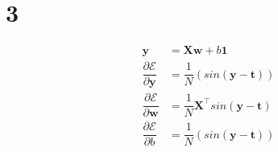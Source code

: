 \documentclass{article}
\begin{document}
\newpage
\section*{3}

\begin{align*}
\textbf{y} &= \mathbf{Xw} + b\mathbf{1} \\
\dfrac{\partial \mathbf{\mathcal{E}}}{\partial \textbf{y}} &= \dfrac{1}{N} (sin(\mathbf{y} - \mathbf{t})) \\
\dfrac{\partial \mathbf{\mathcal{E}}}{\partial \textbf{w}} &= \dfrac{1}{N} \mathbf{X}^\top sin(\mathbf{y} - \mathbf{t}) \\
\dfrac{\partial \mathbf{\mathcal{E}}}{\partial b} &= \dfrac{1}{N} (sin(\mathbf{y} - \mathbf{t})) \\
\end{align*}
\end{document}
